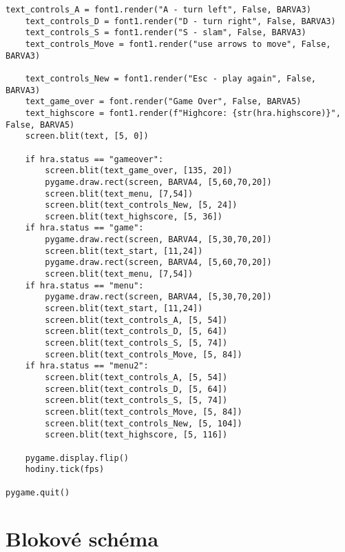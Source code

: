 \documentclass[12pt]{report}			%
\begin{document}
\begin{appendices}
\begin{lstlisting}[title={Program tetris.py}, caption={tetris.py}, 							label={lst:tetris.py}]
    text_controls_A = font1.render("A - turn left", False, BARVA3)
    text_controls_D = font1.render("D - turn right", False, BARVA3)
    text_controls_S = font1.render("S - slam", False, BARVA3)
    text_controls_Move = font1.render("use arrows to move", False, BARVA3)
    
    text_controls_New = font1.render("Esc - play again", False, BARVA3)
    text_game_over = font.render("Game Over", False, BARVA5) 
    text_highscore = font1.render(f"Highcore: {str(hra.highscore)}", False, BARVA5)               
    screen.blit(text, [5, 0])

    if hra.status == "gameover":
        screen.blit(text_game_over, [135, 20])
        pygame.draw.rect(screen, BARVA4, [5,60,70,20])
        screen.blit(text_menu, [7,54])
        screen.blit(text_controls_New, [5, 24])
        screen.blit(text_highscore, [5, 36])
    if hra.status == "game":
        pygame.draw.rect(screen, BARVA4, [5,30,70,20])
        screen.blit(text_start, [11,24])
        pygame.draw.rect(screen, BARVA4, [5,60,70,20])
        screen.blit(text_menu, [7,54])
    if hra.status == "menu":
        pygame.draw.rect(screen, BARVA4, [5,30,70,20])
        screen.blit(text_start, [11,24])
        screen.blit(text_controls_A, [5, 54])
        screen.blit(text_controls_D, [5, 64])
        screen.blit(text_controls_S, [5, 74])
        screen.blit(text_controls_Move, [5, 84])
    if hra.status == "menu2":
        screen.blit(text_controls_A, [5, 54])
        screen.blit(text_controls_D, [5, 64])
        screen.blit(text_controls_S, [5, 74])
        screen.blit(text_controls_Move, [5, 84])
        screen.blit(text_controls_New, [5, 104])
        screen.blit(text_highscore, [5, 116])

    pygame.display.flip()
    hodiny.tick(fps)

pygame.quit()
\end{lstlisting}   	
	\chapter{Blokové schéma}
	\end{appendices}
\end{document}
